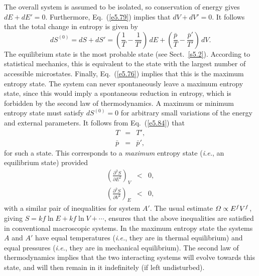 The overall system is assumed to be isolated, so conservation of energy
gives  $ dE + dE' = 0$. Furthermore, Eq.~(\ref{e5.79}) implies that
$dV + dV' =0$. It follows that the total change in  entropy is given by
\begin{equation}
dS^{(0)} = dS + dS' = \left(\frac{1}{T}-\frac{1}{T'}\right)\,dE+
\left(\frac{\bar{p}}{T}-\frac{\bar{p}'}{T'}\right)\,dV.\label{e5.84}
\end{equation}
The equilibrium state is the most  probable state (see Sect.~\ref{s5.2}). 
According to statistical
mechanics, this is equivalent to the state with the largest number of accessible
microstates. Finally, Eq.~(\ref{e5.76}) implies that this  is the
 maximum entropy state. The system can never spontaneously leave a
maximum entropy state,
 since this would imply a spontaneous reduction in 
entropy, which is forbidden by the second law of thermodynamics.
A  maximum or minimum
entropy state must 
satisfy $dS^{(0)} =0$ for arbitrary small variations of the energy
and external parameters. 
It follows from Eq.~(\ref{e5.84})  that
\begin{eqnarray}
T&=& T',\\
\bar{p} &=& \bar{p}',
\end{eqnarray}
for such a state. This corresponds to a {\em maximum}\/ entropy state ({\em i.e.},
an equilibrium state) provided
\begin{eqnarray}
\left(\frac{\partial^2 S}{\partial E^2}\right)_V &<& 0,\\[1ex]
\left(\frac{\partial^2 S}{\partial V^2}\right)_E &<& 0,
\end{eqnarray}
with a similar pair of inequalities for system $A'$. The usual estimate ${\mit\Omega}\propto
E^f V^f$, giving $S = kf\ln E + kf\ln V + \cdots$, ensures that the above inequalities
are satisfied in conventional macroscopic  systems. In the maximum entropy state
the systems $A$ and $A'$ have equal temperatures ({\em i.e.}, they are in thermal 
equilibrium) and equal pressures ({\em i.e.}, they are in mechanical equilibrium). 
The second law of thermodynamics implies that the two interacting systems will
evolve towards this state, and will 
then remain in it
indefinitely (if left undisturbed).


